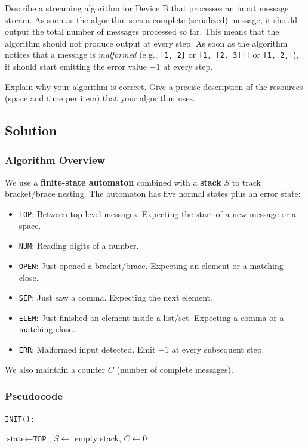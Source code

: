 \documentclass[11pt]{article}
\begin{document}
Describe a streaming algorithm for Device B that processes an input message stream. As soon as the algorithm sees a complete (serialized) message, it should output the total number of messages processed so far. This means that the algorithm should not produce output at every step. As soon as the algorithm notices that a message is \emph{malformed} (e.g., \texttt{[1, 2\}} or \texttt{[1, [2, 3]]]} or \texttt{[1, 2,]}), it should start emitting the error value $-1$ at every step.

Explain why your algorithm is correct. Give a precise description of the resources (space and time per item) that your algorithm uses.

\subsection*{Solution}

\subsubsection*{Algorithm Overview}

We use a \textbf{finite-state automaton} combined with a \textbf{stack} $S$ to track bracket/brace nesting. The automaton has five normal states plus an error state:
\begin{itemize}
\item \texttt{TOP}: Between top-level messages. Expecting the start of a new message or a space.
\item \texttt{NUM}: Reading digits of a number.
\item \texttt{OPEN}: Just opened a bracket/brace. Expecting an element or a matching close.
\item \texttt{SEP}: Just saw a comma. Expecting the next element.
\item \texttt{ELEM}: Just finished an element inside a list/set. Expecting a comma or a matching close.
\item \texttt{ERR}: Malformed input detected. Emit $-1$ at every subsequent step.
\end{itemize}
We also maintain a counter $C$ (number of complete messages).

\subsubsection*{Pseudocode}

\noindent\texttt{INIT():}
\begin{compactitem}
\item $\text{state} \leftarrow \texttt{TOP}$, \quad $S \leftarrow$ empty stack, \quad $C \leftarrow 0$
\end{compactitem}
\end{document}
